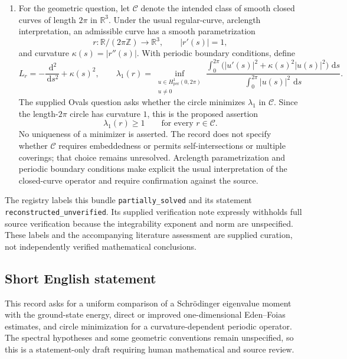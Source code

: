 \documentclass[11pt]{article}
\newcommand{\Z}{\mathbb{Z}}
\newcommand{\R}{\mathbb{R}}
\newcommand{\dd}{\,\mathrm{d}}
\begin{document}
\begin{enumerate}
\item For the geometric question, let \(\mathcal C\) denote the intended class of smooth closed curves of length \(2\pi\) in \(\R^3\). Under the usual regular-curve, arclength interpretation, an admissible curve has a smooth parametrization
\[
r:\R/(2\pi\Z)\longrightarrow\R^3,
\qquad |r'(s)|=1,
\]
and curvature \(\kappa(s)=|r''(s)|\). With periodic boundary conditions, define
\[
L_r=-\frac{\dd^2}{\dd s^2}+\kappa(s)^2,
\qquad
\lambda_1(r)=\inf_{\substack{u\in H^1_{\mathrm{per}}(0,2\pi)\\u\ne0}}
\frac{\displaystyle\int_0^{2\pi}\bigl(|u'(s)|^2+\kappa(s)^2|u(s)|^2\bigr)\,\dd s}
{\displaystyle\int_0^{2\pi}|u(s)|^2\,\dd s}.
\]
The supplied Ovals question asks whether the circle minimizes \(\lambda_1\) in \(\mathcal C\). Since the length-\(2\pi\) circle has curvature \(1\), this is the proposed assertion
\[
\lambda_1(r)\geq1\qquad\text{for every }r\in\mathcal C.
\]
No uniqueness of a minimizer is asserted. The record does not specify whether \(\mathcal C\) requires embeddedness or permits self-intersections or multiple coverings; that choice remains unresolved. Arclength parametrization and periodic boundary conditions make explicit the usual interpretation of the closed-curve operator and require confirmation against the source.
\end{enumerate}

The registry labels this bundle \texttt{partially\_solved} and its statement \texttt{reconstructed\_unverified}. Its supplied verification note expressly withholds full source verification because the integrability exponent and norm are unspecified. These labels and the accompanying literature assessment are supplied curation, not independently verified mathematical conclusions.
\subsection{Short English statement}
This record asks for a uniform comparison of a Schr\"odinger eigenvalue moment with the ground-state energy, direct or improved one-dimensional Eden--Foias estimates, and circle minimization for a curvature-dependent periodic operator. The spectral hypotheses and some geometric conventions remain unspecified, so this is a statement-only draft requiring human mathematical and source review.
\end{document}
